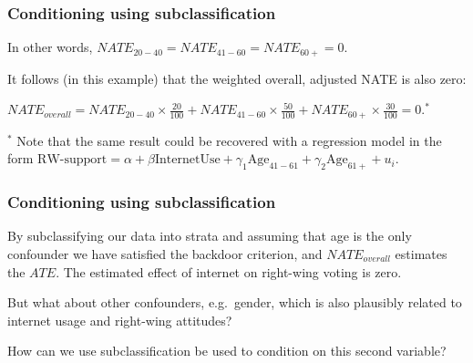 \documentclass[12pt,english,dvipsnames,aspectratio=169,handout]{beamer}\usepackage[]{graphicx}\usepackage[]{xcolor}
\begin{document}
\begin{frame}
  \frametitle{Conditioning using subclassification}
\footnotesize
In other words, $NATE_{20-40} = NATE_{41-60} = NATE_{60+} = 0$.

\footnotesize
It follows (in this example) that the weighted overall, adjusted NATE is also zero: 

$NATE_{overall} = NATE_{20-40}\times\frac{20}{100} + NATE_{41-60}\times\frac{50}{100} + NATE_{60+}\times\frac{30}{100} = 0$.$^*$

\vspace{25mm}

\scriptsize
$^*$ Note that the same result could be recovered with a regression model in the form $\text{RW-support} = \alpha + \beta \text{InternetUse} + \gamma_1 \text{Age}_{41-61} + \gamma_2 \text{Age}_{61+}+ u_i$.

\end{frame}



\begin{frame}
  \frametitle{Conditioning using subclassification}
\footnotesize

By subclassifying our data into strata and assuming that age is the only confounder we have satisfied the backdoor criterion, and $NATE_{overall}$ estimates the $ATE$. The estimated effect of internet on right-wing voting is zero. 

But what about other confounders, e.g.\ gender, which is also plausibly related to internet usage and right-wing attitudes?

How can we use subclassification be used to condition on this second variable?

\vspace{3cm}

\end{frame}
\end{document}

